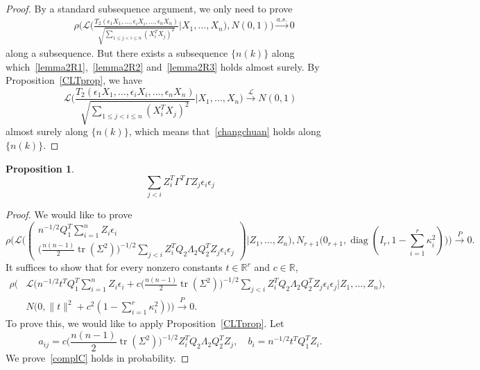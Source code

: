 \documentclass[review]{elsarticle}
\DeclareMathOperator{\mytr}{tr}
\DeclareMathOperator{\mydiag}{diag}
\theoremstyle{plain}
\newtheorem{proposition}{\quad\quad Proposition}
\theoremstyle{definition}
\theoremstyle{remark}
\begin{document}
\begin{proof}
By a standard subsequence argument, we only need to prove 
    \begin{equation}\label{changchuan}
        \begin{aligned}
            &\rho\Big(\mathcal{L}\Big(\frac{T_2(\epsilon_1 X_1,\ldots, \epsilon_i X_i,\ldots,\epsilon_n X_n)}{\sqrt{\sum_{1\leq j<i\leq n}{(X_i^T X_j)}^2}}\Big|X_1,\ldots,X_n\Big),N(0,1)\Big)
            \xrightarrow{a.s.} 0
        \end{aligned}
    \end{equation}
     along a subsequence.
    But there exists a subsequence $\{n(k)\}$ along which~\eqref{lemma2R1},~\eqref{lemma2R2} and~\eqref{lemma2R3} holds almost surely.
    By Proposition~\ref{CLTprop}, we have
    \begin{equation*}
        \mathcal{L}\Big(\frac{T_2(\epsilon_1 X_1,\ldots, \epsilon_i X_i,\ldots,\epsilon_n X_n)}{\sqrt{\sum_{1\leq j<i\leq n}{(X_i^T X_j)}^2}}\Big|X_1,\ldots,X_n\Big)\xrightarrow{\mathcal{L}}N(0,1)
    \end{equation*}
    almost surely along $\{n(k)\}$, which means that~\eqref{changchuan} holds along $\{n(k)\}$.

\end{proof}
\begin{proposition}
    $$
    \sum_{j<i} Z_i^T \Gamma^T \Gamma Z_j \epsilon_i\epsilon_j
    $$
\end{proposition}
\begin{proof}
    We would like to prove
    $$
    \rho\Big(\mathcal{L}\Big(\begin{pmatrix}n^{-1/2}Q_1^T \sum_{i=1}^n Z_i \epsilon_i\\\big(\frac{n(n-1)}{2}\mytr(\Sigma^2)\big)^{-1/2}\sum_{j<i}Z_i^T Q_2\Lambda_2 Q_2^T Z_j \epsilon_i \epsilon_j \end{pmatrix}\Big|Z_1,\ldots,Z_n\Big), N_{r+1}\big(0_{r+1},\mydiag(I_r,1-\sum_{i=1}^r \kappa_i^2)\big)\Big)
        \xrightarrow{P}0.
    $$
    It suffices to show that for every nonzero constants $t\in\mathbb{R}^r$ and $c\in\mathbb{R}$,
    \begin{equation*}
        \begin{aligned}
            \rho\Big(&\mathcal{L}\Big(n^{-1/2} t^T Q_1^T \sum_{i=1}^n Z_i \epsilon_i+c\big(\frac{n(n-1)}{2} \mytr(\Sigma^2)\big)^{-1/2}\sum_{j<i}Z_i^T Q_2 \Lambda_2 Q_2^T Z_j \epsilon_i \epsilon_j\Big| Z_1,\ldots,Z_n\Big)
            ,
            \\
            &
            N\big(0,\|t\|^2+c^2(1-\sum_{i=1}^r \kappa_i^2)\big)\Big)\xrightarrow{P} 0.
        \end{aligned}
    \end{equation*}
To prove this, we would like to apply Proposition~\ref{CLTprop}.
Let
$$
    a_{ij}=c\big(\frac{n(n-1)}{2} \mytr(\Sigma^2)\big)^{-1/2}Z_i^T Q_2 \Lambda_2 Q_2^T Z_j,
    \quad
    b_i=n^{-1/2} t^T Q_1^T Z_i.
$$
    We prove~\eqref{complC} holds in probability.

\end{proof}
\end{document}
